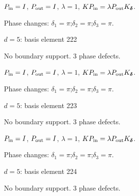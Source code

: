 \begin{center}
\end{center}
\vspace{-1mm}
$P_{\rm in}=I$, \quad $P_{\rm out}=I$, \quad $\lambda=1$, \qquad $K P_{\rm in}=\lambda P_{\rm out}K_{\boldsymbol\delta}$.
\par\smallskip\begin{minipage}{.98\linewidth}\small Phase changes: $\delta_{1}=\pi$;\quad $\delta_{2}=\pi$;\quad $\delta_{3}=\pi$.\end{minipage}
\vfill
{\footnotesize\texttt{}}
\newpage
{}
{\Large $d=5$: basis element 222}\par
No boundary support. 3 phase defects.
\begin{center}
\end{center}
\vspace{-1mm}
$P_{\rm in}=I$, \quad $P_{\rm out}=I$, \quad $\lambda=1$, \qquad $K P_{\rm in}=\lambda P_{\rm out}K_{\boldsymbol\delta}$.
\par\smallskip\begin{minipage}{.98\linewidth}\small Phase changes: $\delta_{1}=\pi$;\quad $\delta_{2}=\pi$;\quad $\delta_{3}=\pi$.\end{minipage}
\vfill
{\footnotesize\texttt{}}
\newpage
{}
{\Large $d=5$: basis element 223}\par
No boundary support. 3 phase defects.
\begin{center}
\end{center}
\vspace{-1mm}
$P_{\rm in}=I$, \quad $P_{\rm out}=I$, \quad $\lambda=1$, \qquad $K P_{\rm in}=\lambda P_{\rm out}K_{\boldsymbol\delta}$.
\par\smallskip\begin{minipage}{.98\linewidth}\small Phase changes: $\delta_{1}=\pi$;\quad $\delta_{2}=\pi$;\quad $\delta_{3}=\pi$.\end{minipage}
\vfill
{\footnotesize\texttt{}}
\newpage
{}
{\Large $d=5$: basis element 224}\par
No boundary support. 3 phase defects.
\begin{center}
\end{center}
